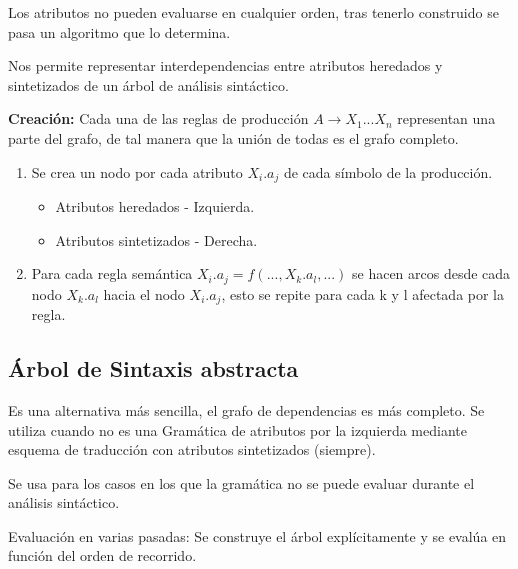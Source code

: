 \documentclass[12pt, twoside, openright]{report} %
\begin{document}
Los atributos no pueden evaluarse en cualquier orden, tras tenerlo construido se pasa un algoritmo que lo determina.

Nos permite representar interdependencias entre atributos heredados y sintetizados de un árbol de análisis sintáctico.

\begin{figure}[H]
  {\def\svgwidth{.9\textwidth}
  }
\end{figure}

\textbf{Creación:} Cada una de las reglas de producción $A \rightarrow X_1 ... X_n$ representan una parte del grafo, de tal manera que la unión de todas es el grafo completo.
\begin{enumerate}
  \item Se crea un nodo por cada atributo $X_i.a_j$ de cada símbolo de la producción.
  \begin{itemize}
    \item Atributos heredados - Izquierda.
    \item Atributos sintetizados - Derecha.
  \end{itemize}
  \item Para cada regla semántica $X_i.a_j = f(...,X_k.a_l, ...)$ se hacen arcos desde cada nodo $X_k.a_l$ hacia el nodo $X_i.a_j$, esto se repite para cada k y l afectada por la regla.
\end{enumerate}
\pagebreak
\subsection{Árbol de Sintaxis abstracta}
Es una alternativa más sencilla, el grafo de dependencias es más completo. Se utiliza cuando no es una Gramática de atributos por la izquierda mediante esquema de traducción con atributos sintetizados (siempre).

Se usa para los casos en los que la gramática no se puede evaluar durante el análisis sintáctico.

Evaluación en varias pasadas: Se construye el árbol explícitamente y se evalúa en función del orden de recorrido.
\end{document}
